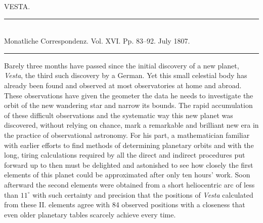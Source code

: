 \clearpage
{}
\hypertarget{native-293-lower}{}
\begin{center}
VESTA.
\end{center}

\begin{center}
\rule{0.6\linewidth}{0.4pt}\\
Monatliche Correspondenz. Vol. XVI. Pp. 83–92. July 1807.\\
\rule{0.6\linewidth}{0.4pt}
\end{center}

\par\indent Barely three months have passed since the initial discovery of a new planet, \emph{Vesta}, the third such discovery by a German. Yet this small celestial body has already been found and observed at most observatories at home and abroad. These observations have given the geometer the data he needs to investigate the orbit of the new wandering star and narrow its bounds. The rapid accumulation of these difficult observations and the systematic way this new planet was discovered, without relying on chance, mark a remarkable and brilliant new era in the practice of observational astronomy. For his part, a mathematician familiar with earlier efforts to find methods of determining planetary orbits and with the long, tiring calculations required by all the direct and indirect procedures put forward up to then must be delighted and astonished to see how closely the first elements of this planet could be approximated after only ten hours’ work. Soon afterward the second elements were obtained from a short heliocentric arc of less than $11^\circ$ with such certainty and precision that the positions of \emph{Vesta} calculated from these II. elements agree with 84 observed positions with a closeness that even older planetary tables scarcely achieve every time.

